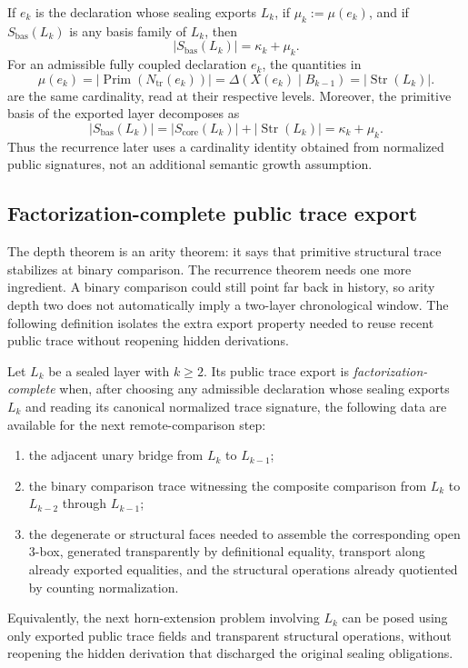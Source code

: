 \documentclass{lmcs}
\begin{document}
If \(e_k\) is the declaration whose sealing exports \(L_k\), if \(\mu_k:=\mu(e_k)\), and if
\(S_{\mathrm{bas}}(L_k)\) is any basis family of \(L_k\), then
\[
  |S_{\mathrm{bas}}(L_k)| = \kappa_k + \mu_k.
\]
For an admissible fully coupled declaration \(e_k\), the quantities in
\[
  \mu(e_k)
  = \left|\operatorname{Prim}(N_{\mathrm{tr}}(e_k))\right|
  = \Delta(X(e_k)\mid B_{k-1})
  = |\operatorname{Str}(L_k)|.
\]
are the same cardinality, read at their respective levels.  Moreover, the primitive basis of
the exported layer decomposes as
\[
  |S_{\mathrm{bas}}(L_k)|
  = |S_{\mathrm{core}}(L_k)| + |\operatorname{Str}(L_k)|
  = \kappa_k + \mu_k.
\]
Thus the recurrence later uses a cardinality identity obtained from normalized public
signatures, not an additional semantic growth assumption.

\subsection{Factorization-complete public trace export}

The depth theorem is an arity theorem: it says that primitive structural trace stabilizes at
binary comparison.  The recurrence theorem needs one more ingredient.  A binary comparison
could still point far back in history, so arity depth two does not automatically imply a
two-layer chronological window.  The following definition isolates the extra export property
needed to reuse recent public trace without reopening hidden derivations.

\begin{defi}
Let \(L_k\) be a sealed layer with \(k\geq 2\).  Its public trace export is
\emph{factorization-complete} when, after choosing any admissible declaration whose sealing
exports \(L_k\) and reading its canonical normalized trace signature, the following data are
available for the next remote-comparison step:
\begin{enumerate}
\item the adjacent unary bridge from \(L_k\) to \(L_{k-1}\);
\item the binary comparison trace witnessing the composite comparison from \(L_k\) to
\(L_{k-2}\) through \(L_{k-1}\);
\item the degenerate or structural faces needed to assemble the corresponding open
\(3\)-box, generated transparently by definitional equality, transport along already exported
equalities, and the structural operations already quotiented by counting normalization.
\end{enumerate}
Equivalently, the next horn-extension problem involving \(L_k\) can be posed using only
exported public trace fields and transparent structural operations, without reopening the
hidden derivation that discharged the original sealing obligations.
\end{defi}
\end{document}

